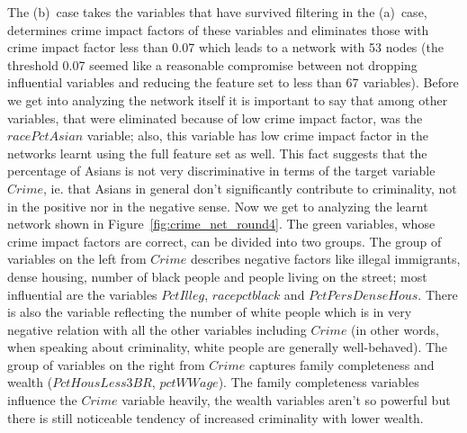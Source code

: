 \documentclass[english,cover]{fitthesis} %
\begin{document}
The (b)~case takes the variables that have survived filtering in the (a)~case, determines crime impact factors of these variables and eliminates those with crime impact factor less than 0.07 which leads to a network with 53 nodes (the threshold 0.07 seemed like a reasonable compromise between not dropping influential variables and reducing the feature set to less than 67 variables). Before we get into analyzing the network itself it is important to say that among other variables, that were eliminated because of low crime impact factor, was the $racePctAsian$ variable; also, this variable has low crime impact factor in the networks learnt using the full feature set as well. This fact suggests that the percentage of Asians is not very discriminative in terms of the target variable $Crime$, ie. that Asians in general don't significantly contribute to criminality, not in the positive nor in the negative sense. Now we get to analyzing the learnt network shown in Figure~\ref{fig:crime_net_round4}. The green variables, whose crime impact factors are correct, can be divided into two groups. The group of variables on the left from $Crime$ describes negative factors like illegal immigrants, dense housing, number of black people and people living on the street; most influential are the variables $PctIlleg$, $racepctblack$ and $PctPersDenseHous$. There is also the variable reflecting the number of white people which is in very negative relation with all the other variables including $Crime$ (in other words, when speaking about criminality, white people are generally well-behaved). The group of variables on the right from $Crime$ captures family completeness and wealth ($PctHousLess3BR$, $pctWWage$). The family completeness variables influence the $Crime$ variable heavily, the wealth variables aren't so powerful but there is still noticeable tendency of increased criminality with lower wealth.
\end{document}

